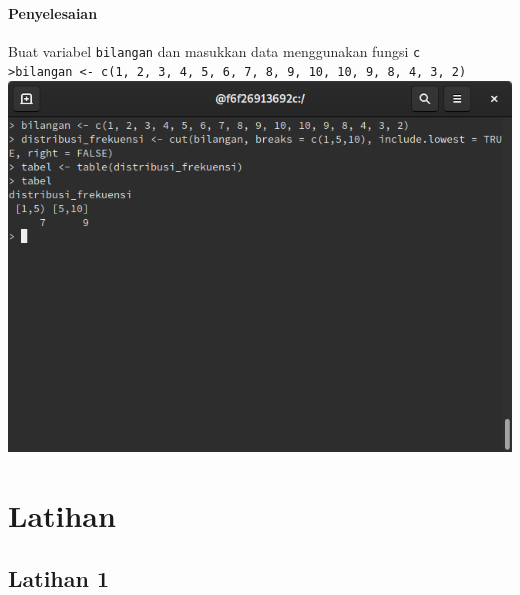 \documentclass[a4paper,12pt]{article}
\begin{document}
\paragraph{Penyelesaian\\}
Buat variabel \texttt{bilangan} dan masukkan data menggunakan fungsi \texttt{c}\\
\texttt{>bilangan <- c(1, 2, 3, 4, 5, 6, 7, 8, 9, 10, 10, 9, 8, 4, 3, 2)}
\includegraphics[width=\linewidth]{4}
\section{Latihan}
\subsection{Latihan 1}
\end{document}
